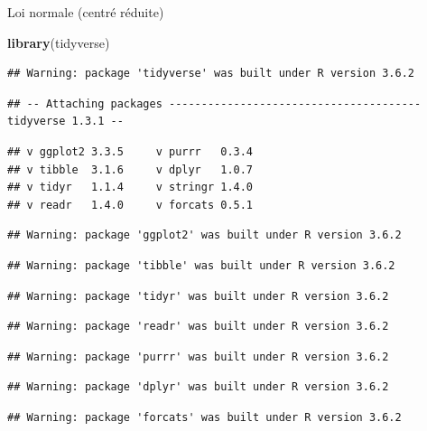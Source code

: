 \documentclass[ignorenonframetext,]{beamer}
\newenvironment{Shaded}{\begin{snugshade}}{\end{snugshade}}
\newcommand{\KeywordTok}[1]{\textcolor[rgb]{0.13,0.29,0.53}{\textbf{#1}}}
\newcommand{\NormalTok}[1]{#1}
\begin{document}
\begin{frame}[fragile]{Loi normale (centré réduite)}

\begin{Shaded}
\begin{Highlighting}[]
\KeywordTok{library}\NormalTok{(tidyverse)}
\end{Highlighting}
\end{Shaded}

\begin{verbatim}
## Warning: package 'tidyverse' was built under R version 3.6.2
\end{verbatim}

\begin{verbatim}
## -- Attaching packages --------------------------------------- tidyverse 1.3.1 --
\end{verbatim}

\begin{verbatim}
## v ggplot2 3.3.5     v purrr   0.3.4
## v tibble  3.1.6     v dplyr   1.0.7
## v tidyr   1.1.4     v stringr 1.4.0
## v readr   1.4.0     v forcats 0.5.1
\end{verbatim}

\begin{verbatim}
## Warning: package 'ggplot2' was built under R version 3.6.2
\end{verbatim}

\begin{verbatim}
## Warning: package 'tibble' was built under R version 3.6.2
\end{verbatim}

\begin{verbatim}
## Warning: package 'tidyr' was built under R version 3.6.2
\end{verbatim}

\begin{verbatim}
## Warning: package 'readr' was built under R version 3.6.2
\end{verbatim}

\begin{verbatim}
## Warning: package 'purrr' was built under R version 3.6.2
\end{verbatim}

\begin{verbatim}
## Warning: package 'dplyr' was built under R version 3.6.2
\end{verbatim}

\begin{verbatim}
## Warning: package 'forcats' was built under R version 3.6.2
\end{verbatim}


\end{frame}
\end{document}
